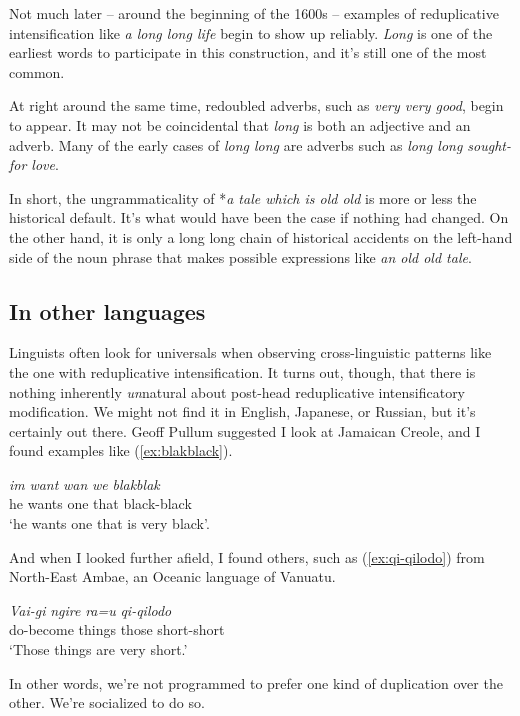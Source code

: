 Not much later -- around the beginning of the 1600s -- examples of reduplicative intensification like \textit{a long long life} begin to show up reliably. \textit{Long} is one of the earliest words to participate in this construction, and it's still one of the most common.

At right around the same time, redoubled adverbs, such as \textit{very very good}, begin to appear. It may not be coincidental that \textit{long} is both an adjective and an adverb. Many of the early cases of \textit{long long} are adverbs such as \textit{long long sought-for love}.

In short, the ungrammaticality of *\textit{a tale which is old old} is more or less the historical default. It's what would have been the case if nothing had changed. On the other hand, it is only a long long chain of historical accidents on the left-hand side of the noun phrase that makes possible expressions like \textit{an old old tale}.

\subsection{In other languages}

Linguists often look for universals when observing cross-linguistic patterns like the one with reduplicative intensification. It turns out, though, that there is nothing inherently \textit{un}natural about post-head reduplicative intensificatory modification. We might not find it in English, Japanese, or Russian, but it's certainly out there. Geoff Pullum suggested I look at Jamaican Creole, and I found examples like (\ref{ex:blakblack}). 

\ea \label{ex:blakblack}
    \gll\textit{im} \textit{want} \textit{wan} \textit{we} \textit{blakblak}\\
    he wants one that black-black\\
    \glt `he wants one that is very black'\hfill\citep[129]{Gooden2003}.
\z

And when I looked further afield, I found others, such as (\ref{ex:qi-qilodo}) from North-East Ambae, an Oceanic language of Vanuatu.

\ea \label{ex:qi-qilodo}
    \gll \textit{Vai-gi} \textit{ngire} \textit{ra=u} \textit{qi-qilodo}\\
        do-become things those short-short \\
    \glt `Those things are very short.'\hfill\citep[278]{Hyslop2004}
\z

In other words, we're not programmed to prefer one kind of duplication over the other. We're socialized to do so.
     
